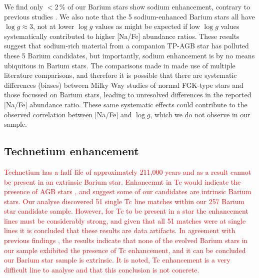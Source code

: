 \documentclass[a4paper,fleqn,usenatbib]{mnras}
\newcommand{\todo}[1]{\textcolor{red}{#1}}
\begin{document}
We find only $<2$\,\% of our Barium stars show sodium enhancement, contrary to previous studies \citep[e.g.][]{decastro2016}. We also note that the 5 sodium-enhanced Barium stars all have $\log{g} \approx 3$, not at lower $\log{g}$ values as might be expected if low $\log{g}$ values systematically contributed to higher [Na/Fe] abundance ratios. These results suggest that sodium-rich material from a companion TP-AGB star has polluted these 5 Barium candidates, but importantly, sodium enhancement is by no means ubiquitous in Barium stars. The comparisons made in \citep{decastro2016} made use of multiple literature comparisons, and therefore it is possible that there are systematic differences (biases) between Milky Way studies of normal FGK-type stars and those focussed on Barium stars, leading to unresolved differences in the reported [Na/Fe] abundance ratio. These same systematic effects could contribute to the observed correlation between [Na/Fe] and $\log{g}$, which we do not observe in our sample.





\subsection{Technetium enhancement}
\todo{Technetium has a half life of approximately 211,000 years and as a result cannot be present in an extrinsic Barium star. Enhancemnt in Tc would indicate the presence of AGB stars \citep{jorissen1993}, and suggest some of our candidates are intrinsic Barium stars. Our analyse discovered 51 single Tc line matches within our 257 Barium star candidate sample. However, for Tc to be present in  a star the enhancement lines must be considerably strong, and given that all 51 matches were at single lines it is concluded that these results are data artifacts. In agreement with previous findings \citep[e.g.][]{little1987,smith1984,smith1983}, the results indicate that none of the evolved Barium stars in our sample exhibited the presence of Tc enhancement, and it can be concluded our Barium star sample is extrinsic. It is noted, Tc enhancement is a very difficult line to analyse and that this conclusion is not concrete.}
\end{document}
